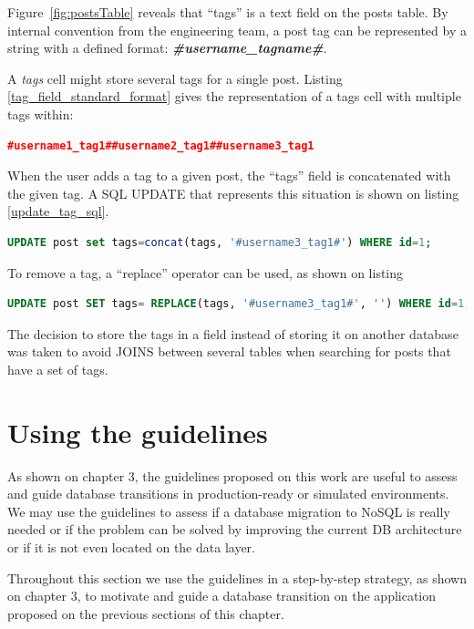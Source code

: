 Figure~\ref{fig:postsTable} reveals that ``tags'' is a text field on the posts table. By internal convention from the engineering team, a post tag can be represented by a string with a defined format: \textbf{\textit{\#username\_tagname\#}}.

A \textit{tags} cell might store several tags for a single post. Listing \ref{tag_field_standard_format} gives the representation of a tags cell with multiple tags within: 

\begin{lstlisting}[language=json,firstnumber=1, caption=Tag field standard format, label=tag_field_standard_format]
#username1_tag1##username2_tag1##username3_tag1 
\end{lstlisting}

When the user adds a tag to a given post, the ``tags'' field is concatenated with the given tag. A SQL UPDATE that represents this situation is shown on listing \ref{update_tag_sql}.

\begin{lstlisting}[language=sql,firstnumber=1, caption=Update Tag - SQL, label=update_tag_sql]
UPDATE post set tags=concat(tags, '#username3_tag1#') WHERE id=1; 
\end{lstlisting}

To remove a tag, a ``replace'' operator can be used, as shown on listing 

\begin{lstlisting}[language=sql,firstnumber=1, caption=Remove Tag - SQL, label=remove_tag_sql]
UPDATE post SET tags= REPLACE(tags, '#username3_tag1#', '') WHERE id=1; 
\end{lstlisting}

The decision to store the tags in a field instead of storing it on another database was taken to avoid JOINS between several tables when searching for posts that have a set of tags.

\section{Using the guidelines}
As shown on chapter 3, the guidelines proposed on this work are useful to assess and guide database transitions in production-ready or simulated environments. We may use the guidelines to assess if a database migration to NoSQL is really needed or if the problem can be solved by improving the current DB architecture or if it is not even located on the data layer.

Throughout this section we use the guidelines in a step-by-step strategy, as shown on chapter 3, to motivate and guide a database transition on the application proposed on the previous sections of this chapter. 

